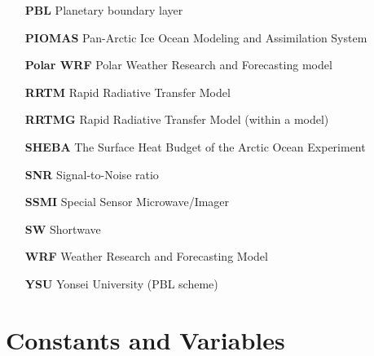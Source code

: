 \begin{enumerate}
    \item[\textbf{PBL}] Planetary boundary layer
    \item[\textbf{PIOMAS}] Pan-Arctic Ice Ocean Modeling and Assimilation System
    \item[\textbf{Polar WRF}] Polar Weather Research and Forecasting model
    \item[\textbf{RRTM}] Rapid Radiative Transfer Model
    \item[\textbf{RRTMG}] Rapid Radiative Transfer Model (within a model)
    \item[\textbf{SHEBA}] The Surface Heat Budget of the Arctic Ocean Experiment
    \item[\textbf{SNR}] Signal-to-Noise ratio
    \item[\textbf{SSMI}] Special Sensor Microwave/Imager
    \item[\textbf{SW}] Shortwave
    \item[\textbf{WRF}] Weather Research and Forecasting Model
    \item[\textbf{YSU}] Yonsei University (PBL scheme)
\end{enumerate}
\section{Constants and Variables}
